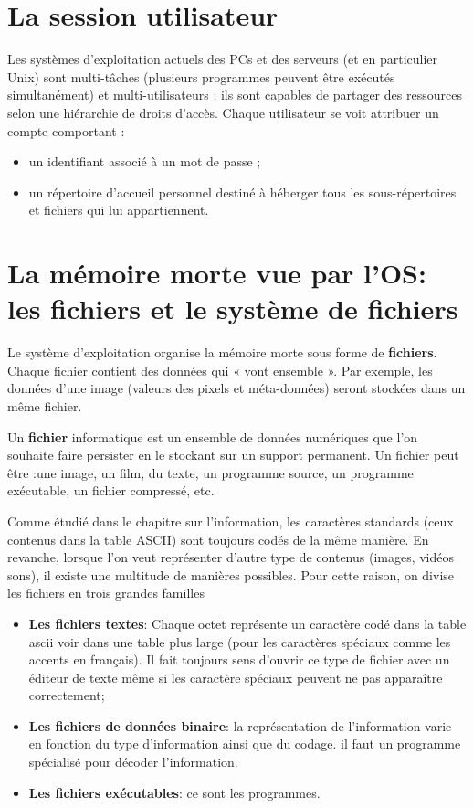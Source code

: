 \section{La session utilisateur}
Les systèmes d’exploitation actuels des PCs et des serveurs (et en particulier Unix) sont multi-tâches (plusieurs programmes peuvent être exécutés simultanément) et multi-utilisateurs : ils sont capables de partager des ressources selon une hiérarchie de droits d’accès. Chaque utilisateur se voit attribuer un compte comportant :
\begin{itemize}
	\item un identifiant associé à un mot de passe ;
	\item un répertoire d’accueil personnel destiné à héberger tous les sous-répertoires et fichiers qui lui appartiennent.
\end{itemize}


\section{La mémoire morte vue par l'OS: les fichiers et le système de fichiers}
Le système d'exploitation organise la mémoire morte sous forme de \textbf{fichiers}. Chaque fichier contient des données qui « vont ensemble ». Par exemple, les données d'une image (valeurs des pixels et méta-données) seront stockées dans un même fichier.
\begin{mydefinition}
	Un \textbf{fichier} informatique est un ensemble de données numériques que l'on souhaite faire persister en le stockant sur un support permanent. Un fichier peut être :une image, un film, du texte, un programme source, un programme exécutable, un fichier compressé, etc.
\end{mydefinition}
Comme étudié dans le chapitre sur l'information, les caractères standards (ceux contenus dans la table ASCII) sont toujours codés de la même manière. En revanche, lorsque l'on veut représenter d'autre type de contenus (images, vidéos sons), il existe une multitude de manières possibles. Pour cette raison, on divise les fichiers en trois grandes familles
\begin{itemize}
	\item \textbf{Les fichiers textes}: Chaque octet représente un caractère codé dans la table ascii voir dans une table plus large (pour les caractères spéciaux comme les accents en français). Il fait toujours sens d'ouvrir ce type de fichier avec un éditeur de texte même si les caractère spéciaux peuvent ne pas apparaître correctement;
	\item \textbf{Les fichiers de données binaire}: la représentation de l'information varie en fonction du type d'information ainsi que du codage. il faut un programme spécialisé pour décoder l'information.
	\item \textbf{Les fichiers exécutables}: ce sont les programmes.
\end{itemize}
